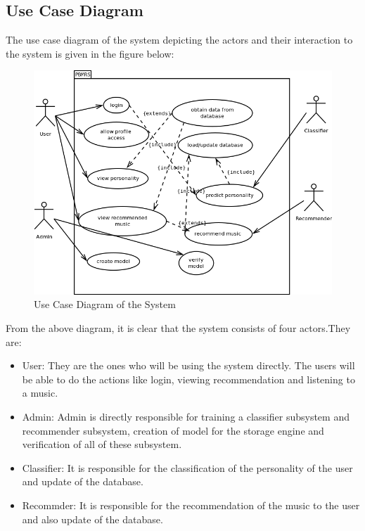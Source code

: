 \newpage
\subsection{Use Case Diagram}
The use case diagram of the system depicting the actors and their interaction to the system is given in the figure below:
\begin{figure}[!ht]
\centering
\includegraphics[width = 16 cm]{fig/usecase.png}
\caption{Use Case Diagram of the System}
\label{fig:usecase}
\end{figure}

From the above diagram, it is clear that the system consists of four actors.They are:
\begin{itemize}
\item User: They are the ones who will be using the system directly. The users will be able to do the actions like login, viewing recommendation and listening to a music. 
\item Admin: Admin is directly responsible for training a classifier subsystem and recommender subsystem, creation of model for the storage engine and verification of all of these subsystem.
\item Classifier: It is responsible for the classification of the personality of the user and update of the database.
\item Recommder: It is responsible for the recommendation of the music to the user and also update of the database.
\end{itemize}

